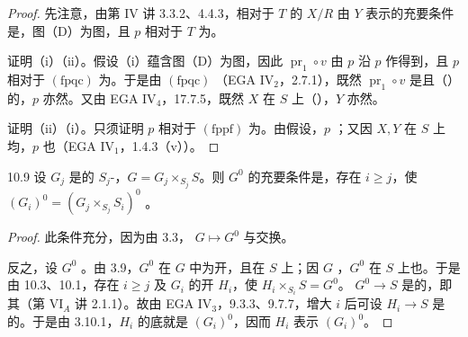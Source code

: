 \begin{proof}
先注意，由第 IV 讲 3.3.2、4.4.3，相对于 $T$ 的 $X/R$ 由 $Y$ 表示的充要条件是，图（D）为图，且 $p$ 相对于 $T$ 为。

证明（i）（ii）。假设（i）蕴含图（D）为图，因此 $\operatorname{pr}_1\circ v$ 由 $p$ 沿 $p$ 作得到，且 $p$ 相对于 $(\mathrm{fpqc})$ 为。于是由 $(\mathrm{fpqc})$ （EGA IV$_2$，2.7.1），既然 $\operatorname{pr}_1\circ v$ 是且（）的，$p$ 亦然。又由 EGA IV$_4$，17.7.5，既然 $X$ 在 $S$ 上（），$Y$ 亦然。

证明（ii）（i）。只须证明 $p$ 相对于 $(\mathrm{fppf})$ 为。由假设，$p$ ；又因 $X,Y$ 在 $S$ 上均，$p$ 也（EGA IV$_1$，1.4.3（v））。
\end{proof}

\begin{SGAresult}{}{10.9}
设 $G_j$ 是的 $S_j$-，$G=G_j\times_{S_j}S$。则 $G^0$ 的充要条件是，存在 $i\geq j$，使 $(G_i)^0=(G_j\times_{S_j}S_i)^0$ 。
\end{SGAresult}
\begin{proof}
此条件充分，因为由 3.3， $G\mapsto G^0$ 与交换。

反之，设 $G^0$ 。由 3.9，$G^0$ 在 $G$ 中为开，且在 $S$ 上；因 $G$ ，$G^0$ 在 $S$ 上也。于是由 10.3、10.1，存在 $i\geq j$ 及 $G_i$ 的开 $H_i$，使 $H_i\times_{S_i}S=G^0$。 $G^0\to S$ 是的，即其（第 VI$_A$ 讲 2.1.1）。故由 EGA IV$_3$，9.3.3、9.7.7，增大 $i$ 后可设 $H_i\to S$ 是的。于是由 3.10.1，$H_i$ 的底就是 $(G_i)^0$，因而 $H_i$ 表示 $(G_i)^0$。
\end{proof}

